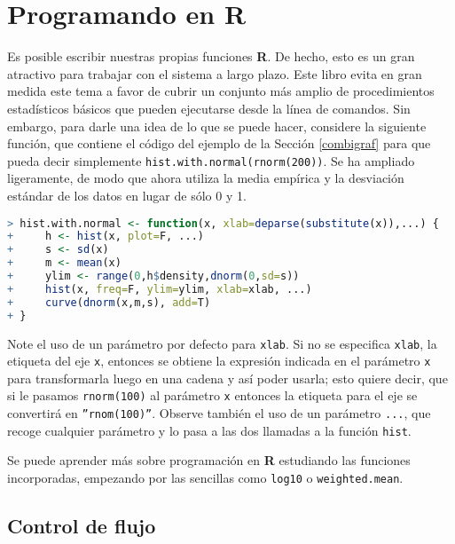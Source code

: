 \section{Programando en \textbf{R}}

Es posible escribir nuestras propias funciones \textbf{R}. De hecho, esto es un
gran atractivo para trabajar con el sistema a largo plazo. Este libro evita en
gran medida este tema a favor de cubrir un conjunto más amplio de
procedimientos estadísticos básicos que pueden ejecutarse desde la línea de
comandos. Sin embargo, para darle una idea de lo que se puede hacer, considere
la siguiente función, que contiene el código del ejemplo de la Sección
\ref{combigraf} para que pueda decir simplemente
\texttt{hist.with.normal(rnorm(200))}. Se ha ampliado ligeramente, de modo que
ahora utiliza la media empírica y la desviación estándar de los datos en lugar
de sólo 0 y 1.

\begin{lstlisting}[language=R]
> hist.with.normal <- function(x, xlab=deparse(substitute(x)),...) {
+     h <- hist(x, plot=F, ...)
+     s <- sd(x)
+     m <- mean(x)
+     ylim <- range(0,h$density,dnorm(0,sd=s))
+     hist(x, freq=F, ylim=ylim, xlab=xlab, ...)
+     curve(dnorm(x,m,s), add=T)
+ }
\end{lstlisting}

Note el uso de un parámetro por defecto para \texttt{xlab}. Si no se especifica
\texttt{xlab}, la etiqueta del eje \texttt{x}, entonces se obtiene la expresión
indicada en el parámetro \texttt{x} para transformarla luego en una cadena y así
poder usarla; esto quiere decir, que si le pasamos \texttt{rnorm(100)} al
parámetro \texttt{x} entonces la etiqueta para el eje se convertirá en
\texttt{''rnom(100)''}. Observe también el uso de un parámetro \texttt{...}, que
recoge cualquier parámetro  y lo pasa a las dos llamadas a la función
\texttt{hist}.

Se puede aprender más sobre programación en \textbf{R} estudiando las funciones
incorporadas, empezando por las sencillas como \texttt{log10} o
\texttt{weighted.mean}.

\subsection{Control de flujo} \label{flowcontrol}

